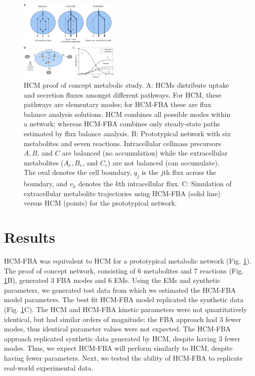\documentclass[10pt,twocolumn,twoside,final]{IEEEtran}
\begin{document}

\begin{figure}[!t]\centering
\includegraphics[width=0.43\textwidth]{./figs/Fig-1-Method-General.pdf}
\caption{HCM proof of concept metabolic study.
A: HCMs distribute uptake and secretion fluxes amongst different pathways. For HCM, these pathways are elementary modes; for HCM-FBA these are flux balance analysis solutions.
HCM combines all possible modes within a network; whereas HCM-FBA combines only steady-state paths estimated by flux balance analysis.
B: Prototypical network with six metabolites and seven reactions.
Intracellular cellmass precursors $A,B$, and $C$ are balanced (no accumulation) while the extracellular metabolites ($A_{e},B_{e}$, and $C_{e}$) are not balanced (can accumulate).
The oval denotes the cell boundary, $q_{j}$ is the $j$th flux across the boundary, and $v_{k}$ denotes the $k$th intracellular flux.
C: Simulation of extracellular metabolite trajectories using HCM-FBA (solid line) versus HCM (points) for the prototypical network.
}\label{fig:model-fitting}
\end{figure}

\section{Results}
HCM-FBA was equivalent to HCM for a prototypical metabolic network (Fig. \ref{fig:model-fitting}).
The proof of concept network, consisting of 6 metabolites and 7 reactions (Fig. \ref{fig:model-fitting}B), generated 3 FBA modes and 6 EMs.
Using the EMs and synthetic parameters, we generated test data from which we estimated the HCM-FBA model parameters.
The best fit HCM-FBA model replicated the synthetic data (Fig. \ref {fig:model-fitting}C).
The HCM and HCM-FBA kinetic parameters were not quantitatively identical, but had similar orders of magnitude;
the FBA approach had 3 fewer modes, thus identical parameter values were not expected.
The HCM-FBA approach replicated synthetic data generated by HCM, despite having 3 fewer modes.
Thus, we expect HCM-FBA will perform similarly to HCM, despite having fewer parameters.
Next, we tested the ability of HCM-FBA to replicate real-world experimental data.
\end{document}
